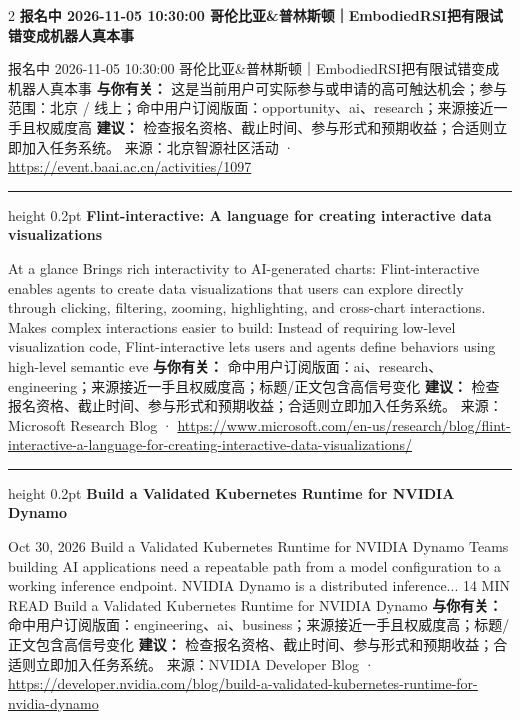 \documentclass[10.5pt]{ctexart}
\begin{document}
\begin{multicols}{2}
{\large\bfseries 报名中 2026-11-05 10:30:00 哥伦比亚\&普林斯顿｜EmbodiedRSI把有限试错变成机器人真本事}\par
报名中 2026-11-05 10:30:00 哥伦比亚\&普林斯顿｜EmbodiedRSI把有限试错变成机器人真本事
\textbf{与你有关：} 这是当前用户可实际参与或申请的高可触达机会；参与范围：北京 / 线上；命中用户订阅版面：opportunity、ai、research；来源接近一手且权威度高
\textbf{建议：} 检查报名资格、截止时间、参与形式和预期收益；合适则立即加入任务系统。
{\footnotesize\color{ormuted} 来源：北京智源社区活动 · \url{https://event.baai.ac.cn/activities/1097}}
\vspace{2mm}
\hrule height 0.2pt
\vspace{2mm}
{\large\bfseries Flint-interactive: A language for creating interactive data visualizations}\par
At a glance Brings rich interactivity to AI-generated charts: Flint-interactive enables agents to create data visualizations that users can explore directly through clicking, filtering, zooming, highlighting, and cross-chart interactions. Makes complex interactions easier to build: Instead of requiring low-level visualization code, Flint-interactive lets users and agents define behaviors using high-level semantic eve
\textbf{与你有关：} 命中用户订阅版面：ai、research、engineering；来源接近一手且权威度高；标题/正文包含高信号变化
\textbf{建议：} 检查报名资格、截止时间、参与形式和预期收益；合适则立即加入任务系统。
{\footnotesize\color{ormuted} 来源：Microsoft Research Blog · \url{https://www.microsoft.com/en-us/research/blog/flint-interactive-a-language-for-creating-interactive-data-visualizations/}}
\vspace{2mm}
\hrule height 0.2pt
\vspace{2mm}
{\large\bfseries Build a Validated Kubernetes Runtime for NVIDIA Dynamo}\par
Oct 30, 2026 Build a Validated Kubernetes Runtime for NVIDIA Dynamo Teams building AI applications need a repeatable path from a model configuration to a working inference endpoint. NVIDIA Dynamo is a distributed inference... 14 MIN READ Build a Validated Kubernetes Runtime for NVIDIA Dynamo
\textbf{与你有关：} 命中用户订阅版面：engineering、ai、business；来源接近一手且权威度高；标题/正文包含高信号变化
\textbf{建议：} 检查报名资格、截止时间、参与形式和预期收益；合适则立即加入任务系统。
{\footnotesize\color{ormuted} 来源：NVIDIA Developer Blog · \url{https://developer.nvidia.com/blog/build-a-validated-kubernetes-runtime-for-nvidia-dynamo}}
\vspace{2mm}

\end{multicols}
\end{document}
